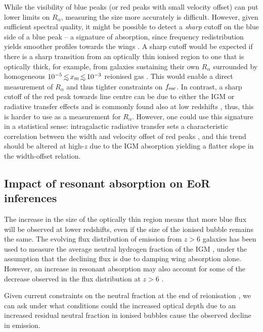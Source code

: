 \documentclass[fleqn,usenatbib]{mnras}
\begin{document}
While the visibility of blue peaks (or red peaks with small velocity offset) can put lower limits on $R_\alpha$, measuring the size more accurately is difficult. However, given sufficient spectral quality, it might be possible to detect a \textit{sharp} cutoff on the blue side of a blue peak -- a signature of absorption, since frequency redistribution yields smoother profiles towards the wings \citep{Neufeld1990}. A sharp cutoff would be expected if there is a sharp transition from an optically thin ionised region to one that is optically thick, for example, from galaxies sustaining their own $R_\alpha$ surrounded by homogeneous $10^{-5} \simlt \xHI \simlt 10^{-3}$ reionised gas \citep[which may be typical of the IGM at the end of reionisation  e.g.,][]{Fan2006}. This would enable a direct measurement of $R_\alpha$ and thus tighter constraints on $\fesc$. In contrast, a sharp cutoff of the red peak towards line centre can be due to either the IGM or radiative transfer effects and is commonly found also at low redshifts \citep[e.g.,][]{Rivera-Thorsen2015,Yang2017a}, thus, this is harder to use as a measurement for $R_\alpha$. However, one could use this signature in a statistical sense: intragalactic radiative transfer sets a characteristic correlation between the width and velocity offset of red \lya peaks \citep[e.g.,][]{Neufeld1990,Verhamme2018a}, and this trend should be altered at high-$z$ due to the IGM absorption yielding a flatter slope in the width-offset relation.

\subsection{Impact of resonant absorption on EoR inferences}
\label{sec:disc_lyafrac}

The increase in the size of the optically thin region means that more blue flux will be observed at lower redshifts, even if the size of the ionised bubble remains the same. The evolving flux distribution of \lya emission from $z>6$ galaxies has been used to measure the average neutral hydrogen fraction of the IGM \citep{Mesinger2015,Mason2018}, under the assumption that the declining flux is due to damping wing absorption alone. However, an increase in resonant absorption may also account for some of the decrease observed in the \lya flux distribution at $z>6$ \citep[see e.g.,][]{Bolton2013a,Mesinger2015}.

Given current constraints on the neutral fraction at the end of reionisation \citep[$z<6$,][]{Fan2006}, we can ask under what conditions could the increased optical depth due to an increased residual neutral fraction in ionised bubbles cause the observed decline in \lya emission.
\end{document}
